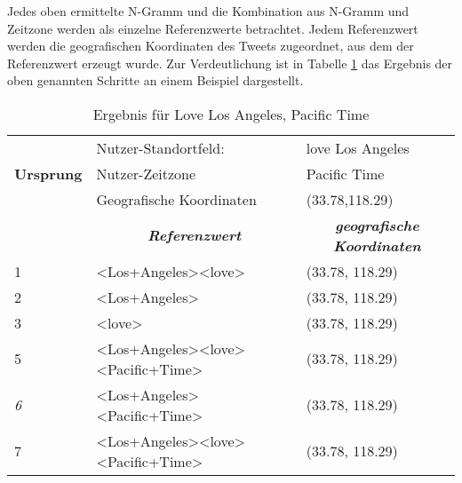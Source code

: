 			Jedes oben ermittelte N-Gramm und die Kombination aus N-Gramm und Zeitzone werden als einzelne Referenzwerte betrachtet. 
			Jedem Referenzwert werden die geografischen Koordinaten des Tweets zugeordnet, aus dem der Referenzwert erzeugt wurde.
			Zur Verdeutlichung ist in Tabelle \ref{tab:bspWerteAusEinemTweet} das Ergebnis der oben genannten Schritte an einem Beispiel dargestellt. 

				\begin{table}[h]
				\begin{tabular}{|l|l|l|}
				\hline
				\textbf{}         & Nutzer-Standortfeld:                                                                       & love Los Angeles                                                \\ \cline{2-3} 
				\textbf{Ursprung} & Nutzer-Zeitzone                                                                            & Pacific Time                                                    \\ \cline{2-3} 
				\textbf{}         & Geografische Koordinaten                                                                   & (33.78,118.29)                                                  \\ \hline
				                  & \multicolumn{1}{c|}{\textit{\textbf{Referenzwert}}}                                        & \multicolumn{1}{c|}{\textit{\textbf{geografische Koordinaten}}} \\ \hline
				1                 & \textless Los+Angeles\textgreater\textless love\textgreater                                  & (33.78, 118.29)                                                 \\ \hline
				2                 & \textless Los+Angeles\textgreater                                                           & (33.78, 118.29)                                                 \\ \hline
				3                 & \textless love\textgreater                                                                  & (33.78, 118.29)                                                 \\ \hline
				5                 & \textless Los+Angeles\textgreater\textless love\textgreater\textless Pacific+Time\textgreater & (33.78, 118.29)                                                 \\ \hline
				\textit{6}        & \textless Los+Angeles\textgreater\textless Pacific+Time\textgreater                          & (33.78, 118.29)                                      \\ \hline
				7                 & \textless Los+Angeles\textgreater\textless love\textgreater\textless Pacific+Time\textgreater & (33.78, 118.29)                                                 \\ \hline
				\end{tabular}
				\caption{Ergebnis für Love Los Angeles, Pacific Time}
					\label{tab:bspWerteAusEinemTweet}
				\end{table}



